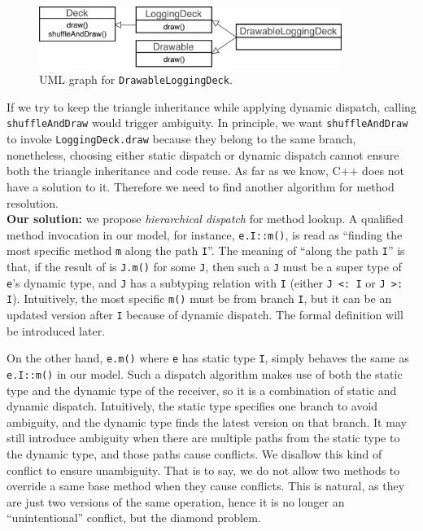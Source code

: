 \begin{figure}[t]
\saveSpaceFig
  \centering
  \includegraphics[height=2cm]{pics/DrawableLoggingDeck.pdf}
  \caption{UML graph for \lstinline|DrawableLoggingDeck|.}\label{fig:drawableloggingdeck}
\saveSpaceFig
\end{figure}
\noindent If we try to keep the triangle inheritance while applying dynamic dispatch, calling \lstinline|shuffleAndDraw| would trigger ambiguity. 
In principle, we want \lstinline|shuffleAndDraw| to invoke \lstinline|LoggingDeck.draw| because they belong to the same branch, 
nonetheless, choosing either static dispatch
or dynamic dispatch cannot ensure both the triangle inheritance and code reuse. As far as we know, C++ does not have a solution
to it. Therefore we need to find another algorithm for method resolution.\\

\noindent\textbf{Our solution:} we propose \textit{hierarchical dispatch} for method lookup. A qualified
method invocation in our model, for instance, \lstinline|e.I::m()|, is read as
``finding the most specific method \lstinline|m| along the path
\lstinline|I|''. The meaning of ``along the path \lstinline|I|'' is
that, if the result of \dispatch{} is \lstinline|J.m()| for some \lstinline|J|, then such a \lstinline|J| must be a super type of \lstinline|e|'s dynamic type, and \lstinline|J| has a subtyping relation with \lstinline|I| (either \lstinline|J <: I| or \lstinline|J >: I|). Intuitively, the most specific \lstinline|m()| must be from branch \lstinline|I|, but it can be an updated version after \lstinline|I| because of dynamic dispatch. The formal definition will be introduced later.

On the other hand, \lstinline|e.m()| where \lstinline|e| has static type \lstinline|I|, simply behaves the same as \lstinline|e.I::m()| in our model. Such a dispatch algorithm makes use of both the static type and the dynamic type of the receiver, so it is a combination of static and dynamic dispatch. Intuitively, the static type specifies one branch to avoid ambiguity, and the dynamic type finds the latest version on that branch. It may still introduce ambiguity when there are multiple paths from the static type to the dynamic type, and those paths cause conflicts. We disallow this kind of conflict to ensure unambiguity. That is to say, we do not allow two methods to override a same base method when they cause conflicts. This is natural, as they are just two versions of the same operation, hence it is no longer an ``unintentional'' conflict, but the diamond problem.

